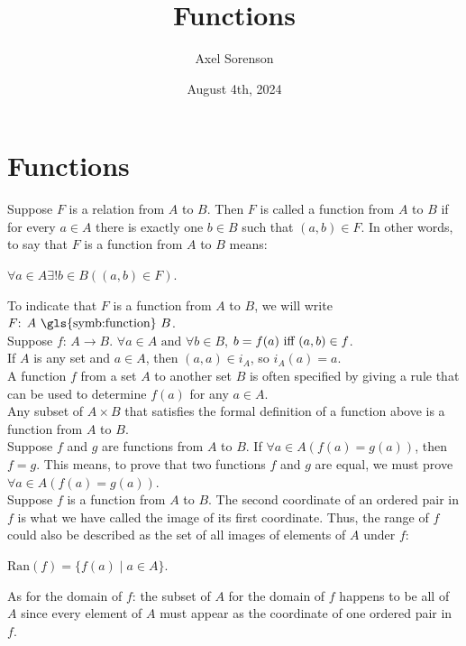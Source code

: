 \documentclass{article}
\title{Functions}
\author{Axel Sorenson}
\date{August 4th, 2024}
\begin{document}
\maketitle

\section{Functions}
Suppose $F$ is a relation from $A$ to $B$. Then $F$ is called a \gls{function} from $A$ to $B$ if for every $a \in A$ there is exactly one $b \in B$ such that $(a, b) \in F$. In other words, to say that $F$ is a function from $A$ to $B$ means:
\begin{center}
    $\forall a \in A \exists!b \in B((a, b) \in F)$.
\end{center}
To indicate that $F$ is a function from $A$ to $B$, we will write $F \text{: } A \text{ \gls{symb:function} } B$.\\

\noindent Suppose $f \text{: } A \to B$. $\forall a \in A \text{ and } \forall b \in B$, $b = f(a) \text{ iff } (a, b) \in f$.\\

\noindent If $A$ is any set and $a \in A$, then $(a, a) \in i_{A}$, so $i_{A}(a) = a$.\\

\noindent A function $f$ from a set $A$ to another set $B$ is often specified by giving a rule that can be used to determine $f(a)$ for any $a \in A$.\\

\noindent Any subset of $A \times B$ that satisfies the formal definition of a function above is a function from $A$ to $B$.\\

\noindent Suppose $f$ and $g$ are functions from $A$ to $B$. If $\forall a \in A(f(a) = g(a))$, then $f = g$. This means, to prove that two functions $f$ and $g$ are equal, we must prove $\forall a \in A(f(a) = g(a))$.\\

\noindent Suppose $f$ is a function from $A$ to $B$. The second coordinate of an ordered pair in $f$ is what we have called the \gls{image} of its first coordinate. Thus, the range of $f$ could also be described as the set of all images of elements of $A$ under $f$:
\begin{center}
    $\text{Ran}(f) = \{f(a) \mid a \in A \}$.
\end{center}
As for the domain of $f$: the subset of $A$ for the domain of $f$ happens to be all of $A$ since every element of $A$ must appear as the coordinate of one ordered pair in $f$.\\
\end{document}
